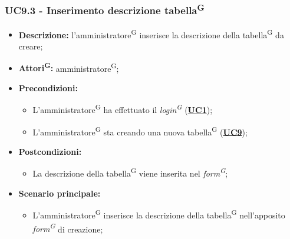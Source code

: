 \subsubsection{UC9.3 - Inserimento descrizione tabella\textsuperscript{G}}
\label{sec:UC9.3}
\begin{itemize}
	\item \textbf{Descrizione:} l’amministratore\textsuperscript{G} inserisce la descrizione della tabella\textsuperscript{G} da creare;
	\item \textbf{Attori\textsuperscript{G}:} amministratore\textsuperscript{G};
	\item \textbf{Precondizioni:} 
	\begin{itemize}
		\item L’amministratore\textsuperscript{G} ha effettuato il \textit{login\textsuperscript{G}} (\hyperref[sec:UC1]{\textbf{UC1}});
		\item L’amministratore\textsuperscript{G} sta creando una nuova tabella\textsuperscript{G} (\hyperref[sec:UC9]{\textbf{UC9}});
	\end{itemize}
	\item \textbf{Postcondizioni:} 
	\begin{itemize}
		\item La descrizione della tabella\textsuperscript{G} viene inserita nel \textit{form\textsuperscript{G}};
	\end{itemize}
	\item \textbf{Scenario principale:} 
	\begin{itemize}
		\item L’amministratore\textsuperscript{G} inserisce la descrizione della tabella\textsuperscript{G} nell'apposito \textit{form\textsuperscript{G}} di creazione;
	\end{itemize}
\end{itemize}

